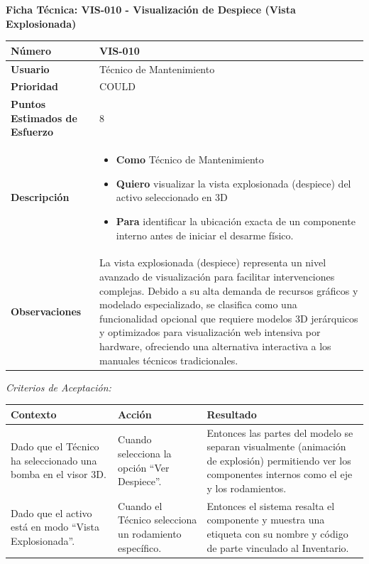 \vspace{1em}
\noindent\textbf{Ficha Técnica: VIS-010 - Visualización de Despiece (Vista Explosionada)}
\footnotesize\setlength{\tabcolsep}{4pt}\renewcommand{\arraystretch}{1.2}
\begin{longtable}{|p{0.21\textwidth}|p{0.74\textwidth}|}\hline
\textbf{Número} & VIS-010 \\ \hline
\textbf{Usuario} & Técnico de Mantenimiento \\ \hline
\textbf{Prioridad} & COULD \\ \hline
\textbf{Puntos Estimados de Esfuerzo} & 8 \\ \hline
\textbf{Descripción} & \parbox[t]{\linewidth}{\vspace{2pt}\begin{itemize}[leftmargin=1.5em, nosep, topsep=0pt]
\item \textbf{Como} Técnico de Mantenimiento
\item \textbf{Quiero} visualizar la vista explosionada (despiece) del activo seleccionado en 3D
\item \textbf{Para} identificar la ubicación exacta de un componente interno antes de iniciar el desarme físico.
\end{itemize}\vspace{2pt}} \\ \hline
\textbf{Observaciones} & La vista explosionada (despiece) representa un nivel avanzado de visualización para facilitar intervenciones complejas. Debido a su alta demanda de recursos gráficos y modelado especializado, se clasifica como una funcionalidad opcional que requiere modelos 3D jerárquicos y optimizados para visualización web intensiva por hardware, ofreciendo una alternativa interactiva a los manuales técnicos tradicionales. \\ \hline
\end{longtable}\normalsize
\noindent\textit{Criterios de Aceptación:}
\footnotesize\begin{longtable}{|p{0.28\textwidth}|p{0.32\textwidth}|p{0.34\textwidth}|}\hline
\textbf{Contexto} & \textbf{Acción} & \textbf{Resultado} \\ \hline
\parbox[t]{\linewidth}{Dado que el Técnico ha seleccionado una bomba en el visor 3D.} & \parbox[t]{\linewidth}{Cuando selecciona la opción ``Ver Despiece''.} & \parbox[t]{\linewidth}{Entonces las partes del modelo se separan visualmente (animación de explosión) permitiendo ver los componentes internos como el eje y los rodamientos.} \\ \hline
\parbox[t]{\linewidth}{Dado que el activo está en modo ``Vista Explosionada''.} & \parbox[t]{\linewidth}{Cuando el Técnico selecciona un rodamiento específico.} & \parbox[t]{\linewidth}{Entonces el sistema resalta el componente y muestra una etiqueta con su nombre y código de parte vinculado al Inventario.} \\ \hline
\end{longtable}\normalsize
